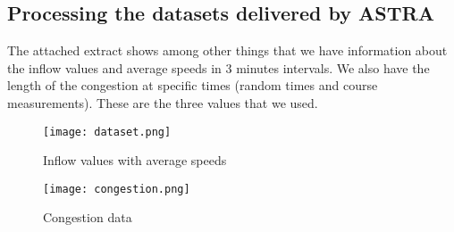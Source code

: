 \subsection{Processing the datasets delivered by ASTRA}
The attached extract shows among other things that we have information about the inflow values and average speeds in 3 minutes intervals. We also have the length of the congestion at specific times (random times and course measurements). These are the three values that we used.

\begin{figure}[H]
\texttt{[image: dataset.png]}
\caption{Inflow values with average speeds}
\end{figure}

\begin{figure}[H]
\texttt{[image: congestion.png]}
\caption{Congestion data}
\end{figure}
